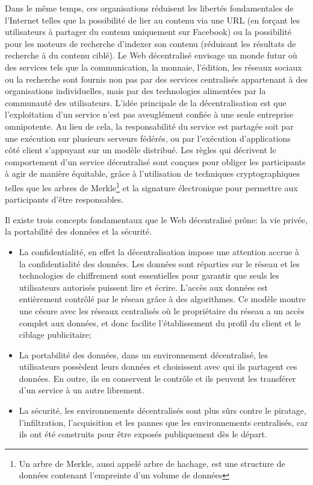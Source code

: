 \documentclass{tnreport}
\begin{document}
Dans le même temps, ces organisations réduisent les libertés fondamentales de l'Internet telles que la possibilité de lier au contenu via une URL (en forçant les utilisateurs à partager du contenu uniquement sur Facebook) ou la possibilité pour les moteurs de recherche d'indexer son contenu (réduisant les résultats de recherche à du contenu ciblé).
Le Web décentralisé envisage un monde futur où des services tels que la communication, la monnaie, l'édition, les réseaux sociaux ou la recherche sont fournis non pas par des services centralisés appartenant à des organisations individuelles, mais par des technologies alimentées par la communauté des utilisateurs.
L'idée principale de la décentralisation est que l'exploitation d'un service n'est pas aveuglément confiée à une seule entreprise omnipotente. Au lieu de cela, la responsabilité du service est partagée soit par une exécution sur plusieurs serveurs fédérés, ou par l'exécution d'applications côté client s'appuyant sur un modèle distribué.
Les règles qui décrivent le comportement d'un service décentralisé sont conçues pour obliger les participants à agir de manière équitable, grâce à l'utilisation de techniques cryptographiques telles que les arbres de Merkle\footnote{Un arbre de Merkle, aussi appelé arbre de hachage, est une structure de données contenant l'empreinte d'un volume de données} et la signature électronique pour permettre aux participants d'être responsables.

Il existe trois concepts fondamentaux que le Web décentralisé prône: la vie privée, la portabilité des données et la sécurité.
\begin{itemize}
	\item La confidentialité, en effet la décentralisation impose une attention accrue à la confidentialité des données. Les données sont réparties sur le réseau et les technologies de chiffrement sont essentielles pour garantir que seuls les utilisateurs autorisés puissent lire et écrire. L'accès aux données est entièrement contrôlé par le réseau grâce à des algorithmes. Ce modèle montre une césure avec les réseaux centralisés où le propriétaire du réseau a un accès complet aux données, et donc facilite l'établissement du profil du client et le ciblage publicitaire;
	\item La portabilité des données, dans un environnement décentralisé, les utilisateurs possèdent leurs données et choisissent avec qui ils partagent ces données. En outre, ils en conservent le contrôle et ils peuvent les transférer d'un service à un autre librement.
	\item La sécurité, les environnements décentralisés sont plus sûrs contre le piratage, l'infiltration, l'acquisition et les pannes que les environnements centralisés, car ils ont été construits pour être exposés publiquement dès le départ.
	\newline
\end{itemize}
\end{document}
